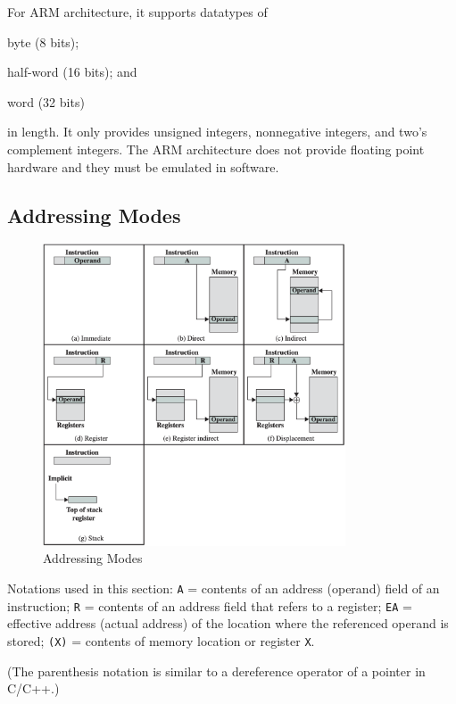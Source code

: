 For ARM architecture, it supports datatypes of \begin{enumerate*}[label=\textbf{(\arabic*)}]
    \item byte (8 bits);
    \item half-word (16 bits); and
    \item word (32 bits)
\end{enumerate*} in length.
It only provides unsigned integers, nonnegative integers, and two's complement integers. 
The ARM architecture does not provide floating point hardware and they must be emulated in
software.

\subsection{Addressing Modes}

\begin{figure}[H]
    \centering
    \includegraphics[width=0.8\textwidth]{chaps/instructions-sets/addressing-modes.png}
    \caption{Addressing Modes}
\end{figure}

\begin{remark}
    Notations used in this section:
    \texttt{A} = contents of an address (operand) field of an instruction;
    \texttt{R} = contents of an address field that refers to a register;
    \texttt{EA} = effective address (actual address) of the location where the referenced operand is stored;
    \texttt{(X)} = contents of memory location or register \texttt{X}.

    (The parenthesis notation is similar to a dereference operator of a pointer in C/C++.)
\end{remark}

